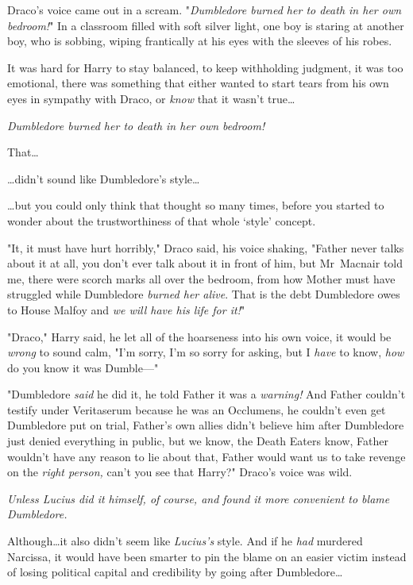 Draco’s voice came out in a scream. "\emph{Dumbledore burned her to death in
her own bedroom!}"
\later
In a classroom filled with soft silver light, one boy is staring at another
boy, who is sobbing, wiping frantically at his eyes with the sleeves of his
robes.

It was hard for Harry to stay balanced, to keep withholding judgment, it was
too emotional, there was something that either wanted to start tears from his
own eyes in sympathy with Draco, or \emph{know} that it wasn’t true…

\emph{Dumbledore burned her to death in her own bedroom!}

That…

…didn’t sound like Dumbledore’s style…

…but you could only think that thought so many times, before you started
to wonder about the trustworthiness of that whole ‘style’ concept.

"It, it must have hurt horribly," Draco said, his voice shaking, "Father never
talks about it at all, you don’t ever talk about it in front of him, but
Mr~Macnair told me, there were scorch marks all over the bedroom, from how
Mother must have struggled while Dumbledore \emph{burned her alive}. That is
the debt Dumbledore owes to House Malfoy and \emph{we will have his life for
it!}"

"Draco," Harry said, he let all of the hoarseness into his own voice, it would
be \emph{wrong} to sound calm, "I’m sorry, I’m so sorry for asking, but I
\emph{have} to know, \emph{how} do you know it was Dumble—"

"Dumbledore \emph{said} he did it, he told Father it was a \emph{warning!} And
Father couldn’t testify under Veritaserum because he was an Occlumens, he
couldn’t even get Dumbledore put on trial, Father’s own allies didn’t believe
him after Dumbledore just denied everything in public, but we know, the Death
Eaters know, Father wouldn’t have any reason to lie about that, Father would
want us to take revenge on the \emph{right person,} can’t you see that Harry?"
Draco’s voice was wild.

\emph{Unless Lucius did it himself, of course, and found it more convenient to
blame Dumbledore.}

Although…it also didn’t seem like \emph{Lucius’s} style. And if he
\emph{had} murdered Narcissa, it would have been smarter to pin the blame on an
easier victim instead of losing political capital and credibility by going
after Dumbledore…

